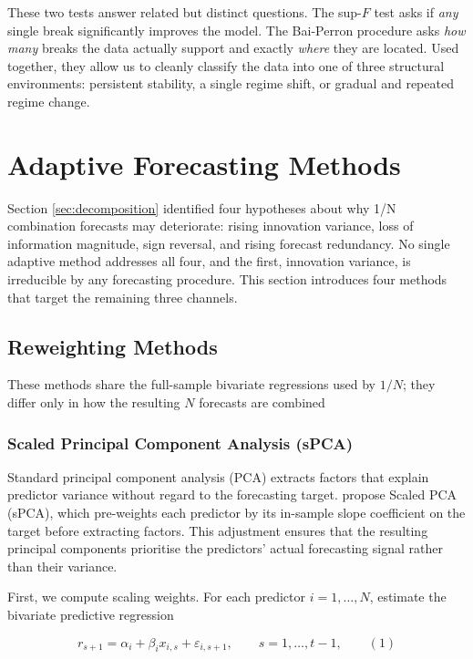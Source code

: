 \documentclass[a4paper,11pt]{article}
\begin{document}
These two tests answer related but distinct questions. The sup-$F$ test asks if \textit{any} single break significantly improves the model. The Bai-Perron procedure asks \textit{how many} breaks the data actually support and exactly \textit{where} they are located. Used together, they allow us to cleanly classify the data into one of three structural environments: persistent stability, a single regime shift, or gradual and repeated regime change.

\section{Adaptive Forecasting Methods}

Section \ref{sec:decomposition} identified four hypotheses about why 1/N combination forecasts may deteriorate: rising innovation variance, loss of information magnitude, sign reversal, and rising forecast redundancy. No single adaptive method addresses all four, and the first, innovation variance, is irreducible by any forecasting procedure. This section introduces four methods that target the remaining three channels.

\subsection{Reweighting Methods}
These methods share the full-sample bivariate regressions used by $1/N$; they differ only in how the resulting $N$ forecasts are combined

\subsubsection{Scaled Principal Component Analysis (sPCA)}

Standard principal component analysis (PCA) extracts factors that explain predictor variance without regard to the forecasting target. \citet{huang2022scale} propose Scaled PCA (sPCA), which pre-weights each predictor by its in-sample slope coefficient on the target before extracting factors. This adjustment ensures that the resulting principal components prioritise the predictors' actual forecasting signal rather than their variance.

 First, we compute scaling weights. For each predictor $i = 1, \ldots, N$, estimate the bivariate predictive regression

$$r_{s+1} = \alpha_i + \beta_i x_{i,s} + \varepsilon_{i,s+1}, \qquad s = 1, \ldots, t-1, \qquad (1)$$
\end{document}
